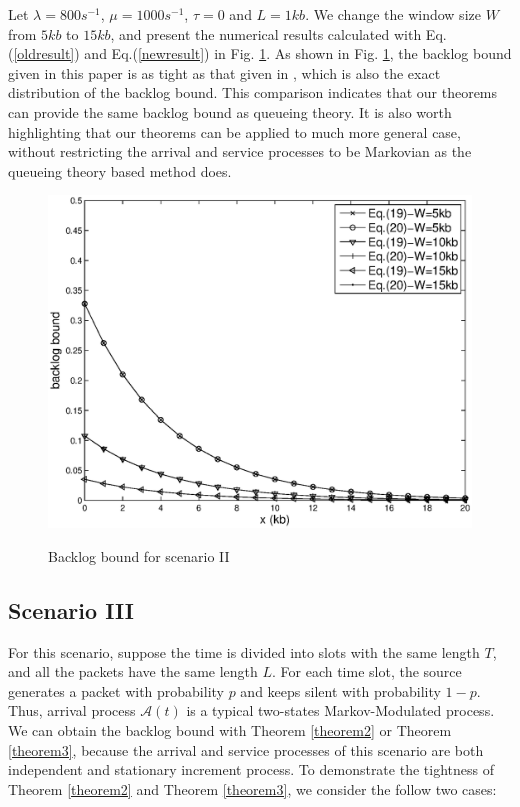 \documentclass[12pt]{article}
\begin{document}
Let $\lambda=800s^{-1}$, $\mu=1000s^{-1}$, $\tau=0$ and $L=1kb$. We change the window size $W$ from $5kb$ to $15kb$, and present the numerical results calculated with Eq.(\ref{oldresult}) and Eq.(\ref{newresult}) in Fig. \ref{result3}. As shown in Fig. \ref{result3}, the backlog bound given in this paper is as tight as that given in \cite{jung1996analysis}, which is also the exact distribution of the backlog bound. This comparison indicates that our theorems can provide the same backlog bound as queueing theory. It is also worth highlighting that our theorems can be applied to much more general case, without restricting the arrival and service processes to be Markovian as the queueing theory based method does.
\begin{figure}
  \centering
  \includegraphics[scale=0.45]{figures/backlogcomp.eps}\\
  \caption{Backlog bound for scenario II}\label{result3}
\end{figure}

\subsection{Scenario III}
For this scenario, suppose the time is divided into slots with the same length $T$, and all the packets have the same length $L$. For each time slot, the source generates a packet with probability $p$ and keeps silent with probability $1-p$. Thus, arrival process $\mathcal{A}(t)$ is a typical two-states Markov-Modulated process. We can obtain the backlog bound with Theorem \ref{theorem2} or Theorem \ref{theorem3}, because the arrival and service processes of this scenario are both independent and stationary increment process. To demonstrate the tightness of Theorem \ref{theorem2} and Theorem \ref{theorem3}, we consider the follow two cases:
\end{document}
